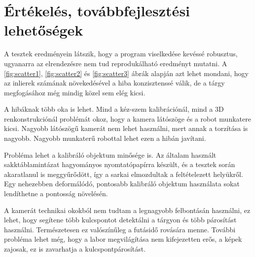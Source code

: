 \chapter{Értékelés, továbbfejlesztési lehetőségek}

A tesztek eredményein látszik, hogy a program viselkedése kevéssé robusztus, ugyanarra az elrendezésre nem tud reprodukálható eredményt mutatni. A \ref{fig:scatter1}, \ref{fig:scatter2} és \ref{fig:scatter3} ábrák alapján azt lehet mondani, hogy az inlierek számának növekedésével a hiba konzisztenssé válik, de a tárgy megfogásához még mindig közel sem elég kicsi.

A hibáknak több oka is lehet. Mind a kéz-szem kalibrációnál, mind a 3D renkonstrukciónál problémát okoz, hogy a kamera látószöge és a robot munkatere kicsi. Nagyobb látószögű kamerát nem lehet használni, mert annak a torzítása is nagyobb. Nagyobb munkaterű robottal lehet ezen a hibán javítani.

Probléma lehet a kalibráló objektum minősége is. Az általam használt sakktáblamintázat hagyományos nyomtatópapírra készült, és a tesztek során akaratlanul is meggyűrődött, így a sarkai elmozdultak a feltételezett helyükről. Egy nehezebben deformálódó, pontosabb kalibráló objektum használata sokat lendíthetne a pontosság növelésén.

A kamerát technikai okokból nem tudtam a legnagyobb felbontásán használni, ez lehet, hogy segítene több kulcspontot detektálni a tárgyon és több párosítást használni. Természetesen ez valószínűleg a futásidő rovására menne. További probléma lehet még, hogy a labor megvilágítása nem kifejezetten erős, a képek zajosak, ez is zavarhatja a kulcspontpárosítást.